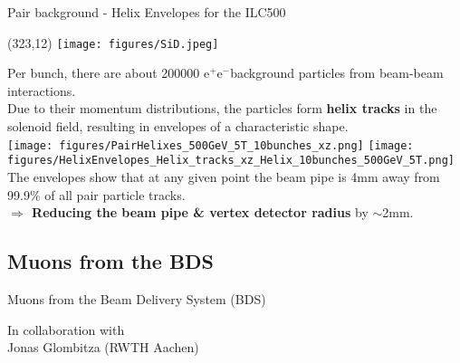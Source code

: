 \documentclass[xcolor={dvipsnames}]{beamer}
\newcommand{\sidlogo}{
  \setlength{\TPHorizModule}{1pt}
  \setlength{\TPVertModule}{1pt}
  \begin{textblock}{1}(323,12)
   \texttt{[image: figures/SiD.jpeg]}
  \end{textblock}
  }
\newcommand{\electron}{e$^-$}
\newcommand{\positron}{e$^+$}
\begin{document}
\begin{frame}{Pair background - Helix Envelopes for the ILC500}
\sidlogo
Per bunch, there are about \num{200000} \positron \electron background particles from beam-beam interactions.\\
Due to their momentum distributions, the particles form \textbf{helix tracks} in the solenoid field, resulting in envelopes of a characteristic shape.\\
\vspace*{0.1cm}
   \texttt{[image: figures/PairHelixes\_500GeV\_5T\_10bunches\_xz.png]}\hspace*{0.1cm}
   \texttt{[image: figures/HelixEnvelopes\_Helix\_tracks\_xz\_Helix\_10bunches\_500GeV\_5T.png]}\\
The envelopes show that at any given point the beam pipe is 4mm away from 99.9\% of all pair particle tracks.\\
\textbf{$\Rightarrow$ Reducing the beam pipe \& vertex detector radius} by $\sim$2mm.
\end{frame}

\subsection{Muons from the BDS}
\begin{frame}
 \vspace*{3cm}
 \begin{center}
  \LARGE Muons from the Beam Delivery System (BDS)
 \end{center}
 \vspace*{3cm}
\begin{flushright}
 \small In collaboration with\\Jonas Glombitza (RWTH Aachen)
\end{flushright}

\end{frame}
\end{document}
